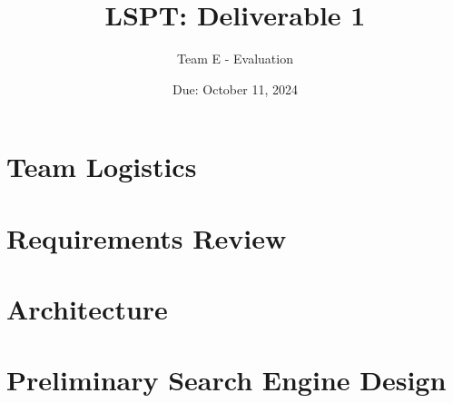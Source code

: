 \documentclass{article}
\title{LSPT: Deliverable 1}
\author{Team E - Evaluation}
\date{Due: October 11, 2024}
\begin{document}
  \maketitle
  \section*{Team Logistics}
  

  \section*{Requirements Review}
  

  \section*{Architecture}
  

  \section*{Preliminary Search Engine Design}
  
\end{document}

